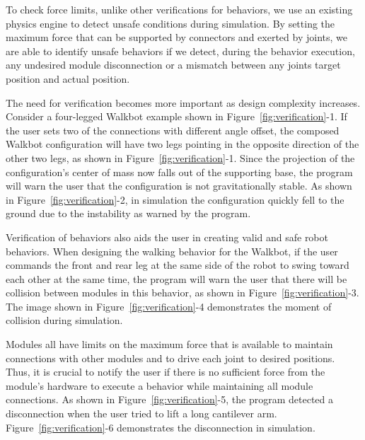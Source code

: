 \documentclass[graybox]{svmult}
\newcommand{\TODO}[1]{ {\bf \textcolor{red}{TODO:} #1 }}
\begin{document}
To check force limits, unlike other verifications for behaviors, we use an existing physics engine to detect unsafe conditions during simulation. By setting the maximum force that
can be supported by connectors and exerted by  joints, we are able to identify unsafe behaviors if we detect, during the behavior execution, any undesired module disconnection or a  mismatch between any
joints target position and actual  position.


The need for verification becomes more important as design complexity increases. Consider a four-legged Walkbot example shown in Figure~\ref{fig:verification}-1. If the user sets two of the connections with different angle offset, the composed Walkbot configuration will have two legs pointing in the opposite direction of the other two legs, as shown in Figure~\ref{fig:verification}-1. Since the projection of the configuration's center of mass now falls out of the supporting base, the program will warn the user that the configuration is not gravitationally stable. As shown in Figure~\ref{fig:verification}-2, in simulation the configuration quickly fell to the ground due to the instability as warned by the program. 

Verification of behaviors  also aids the user in creating valid and safe robot behaviors. When designing the walking behavior for the Walkbot, if the user commands the front and rear leg at the same side of the robot to swing toward each other at the same time, the program will warn the user that there will be collision between modules in this behavior, as shown in Figure~\ref{fig:verification}-3. The image shown in Figure~\ref{fig:verification}-4 demonstrates the moment of collision during simulation.

Modules all have limits on the maximum force that is available to maintain connections with other modules and to drive each joint to desired positions. Thus, it is crucial to notify the user if there is no sufficient force from the module's hardware to execute a behavior while maintaining all module connections. 
As shown in Figure~\ref{fig:verification}-5, the program detected a disconnection when the user tried to lift a long cantilever arm. Figure~\ref{fig:verification}-6 demonstrates the disconnection in simulation.
 
\end{document}
